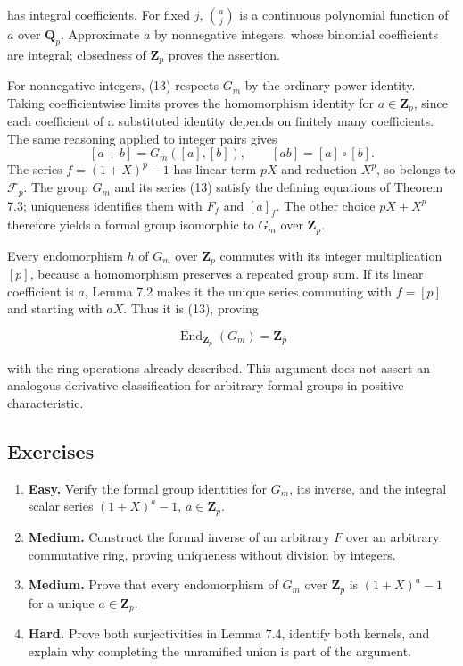 \documentclass[11pt,a4paper]{article}
\newcommand{\tightlist}{\setlength{\itemsep}{0pt}\setlength{\parskip}{0pt}}
\begin{document}
has integral coefficients. For fixed \(j\), \(\binom aj\) is a
continuous polynomial function of \(a\) over \(\mathbf Q_p\).
Approximate \(a\) by nonnegative integers, whose binomial coefficients
are integral; closedness of \(\mathbf Z_p\) proves the assertion.

For nonnegative integers, (13) respects \(G_m\) by the ordinary power
identity. Taking coefficientwise limits proves the homomorphism identity
for \(a\in\mathbf Z_p\), since each coefficient of a substituted
identity depends on finitely many coefficients. The same reasoning
applied to integer pairs gives \[
[a+b]=G_m([a],[b]),\qquad [ab]=[a]\circ[b].
\] The series \(f=(1+X)^p-1\) has linear term \(pX\) and reduction
\(X^p\), so belongs to \(\mathcal F_p\). The group \(G_m\) and its
series (13) satisfy the defining equations of Theorem 7.3; uniqueness
identifies them with \(F_f\) and \([a]_f\). The other choice \(pX+X^p\)
therefore yields a formal group isomorphic to \(G_m\) over
\(\mathbf Z_p\).

Every endomorphism \(h\) of \(G_m\) over \(\mathbf Z_p\) commutes with
its integer multiplication \([p]\), because a homomorphism preserves a
repeated group sum. If its linear coefficient is \(a\), Lemma 7.2 makes
it the unique series commuting with \(f=[p]\) and starting with \(aX\).
Thus it is (13), proving

\[
\operatorname{End}_{\mathbf Z_p}(G_m)=\mathbf Z_p
\]

with the ring operations already described. This argument does not
assert an analogous derivative classification for arbitrary formal
groups in positive characteristic.

\subsection{Exercises}\label{exercises}

\begin{enumerate}
\def\labelenumi{\arabic{enumi}.}
\tightlist
\item
  \textbf{Easy.} Verify the formal group identities for \(G_m\), its
  inverse, and the integral scalar series \((1+X)^a-1\),
  \(a\in\mathbf Z_p\).
\item
  \textbf{Medium.} Construct the formal inverse of an arbitrary \(F\)
  over an arbitrary commutative ring, proving uniqueness without
  division by integers.
\item
  \textbf{Medium.} Prove that every endomorphism of \(G_m\) over
  \(\mathbf Z_p\) is \((1+X)^a-1\) for a unique \(a\in\mathbf Z_p\).
\item
  \textbf{Hard.} Prove both surjectivities in Lemma 7.4, identify both
  kernels, and explain why completing the unramified union is part of
  the argument.
\end{enumerate}
\end{document}
